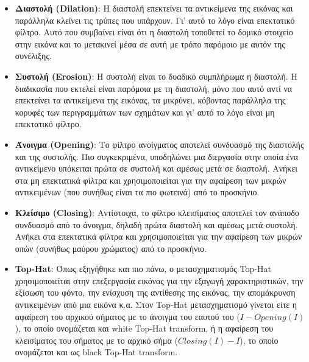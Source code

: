 \begin{itemize}
    \item \textbf{Διαστολή (Dilation)}: Η διαστολή επεκτείνει τα αντικείμενα της εικόνας και παράλληλα κλείνει τις τρύπες που υπάρχουν. Γι' αυτό το λόγο είναι επεκτατικό φίλτρο. Αυτό που συμβαίνει είναι ότι η διαστολή τοποθετεί το δομικό στοιχείο στην εικόνα και το μετακινεί μέσα σε αυτή με τρόπο παρόμοιο με αυτόν της συνέλιξης.
    \item \textbf{Συστολή (Erosion)}: H συστολή είναι το δυαδικό συμπλήρωμα η διαστολή. Η διαδικασία που εκτελεί είναι παρόμοια με τη διαστολή, μόνο που αυτό αντί να επεκτείνει τα αντικείμενα της εικόνας, τα μικρύνει, κόβοντας παράλληλα της κορυφές των περιγραμμάτων των σχημάτων και γι' αυτό το λόγο είναι μη επεκτατικό φίλτρο.
    \item \textbf{Άνοιγμα (Opening)}: Το φίλτρο ανοίγματος αποτελεί συνδυασμό της διαστολής και της συστολής. Πιο συγκεκριμένα, υποδηλώνει μια διεργασία στην οποία ένα αντικείμενο υπόκειται πρώτα σε συστολή και αμέσως μετά σε διαστολή. Ανήκει στα μη επεκτατικά φίλτρα και χρησιμοποιείται για την αφαίρεση των μικρών αντικειμένων (που συνήθως είναι τα πιο φωτεινά) από το προσκήνιο.
    \item \textbf{Κλείσιμο (Closing)}: Αντίστοιχα, το φίλτρο κλεισίματος αποτελεί τον ανάποδο συνδυασμό από το άνοιγμα, δηλαδή πρώτα διαστολή και αμέσως μετά συστολή. Ανήκει στα επεκτατικά φίλτρα και χρησιμοποιείται για την αφαίρεση των μικρών οπών (συνήθως μαύρου χρώματος) από το προσκήνιο.
    \item \textbf{Top-Hat}: Όπως εξηγήθηκε και πιο πάνω, ο μετασχηματισμός Top-Hat χρησιμοποιείται στην επεξεργασία εικόνας για την εξαγωγή χαρακτηριστικών, την εξίσωση του φόντο, την ενίσχυση της αντίθεσης της εικόνας, την απομάκρυνση αντικειμένων από μια εικόνα κ.α. Στον Top-Hat μετασχηματισμό γίνεται είτε η αφαίρεση του αρχικού σήματος με το άνοιγμα του εαυτού του ($ I - Opening(I)$), το οποίο ονομάζεται και white Top-Hat transform, ή η αφαίρεση του κλεισίματος του σήματος με το αρχικό σήμα ($Closing(I)-I$), το οποίο ονομάζεται και ως black Top-Hat transform.
\end{itemize}
